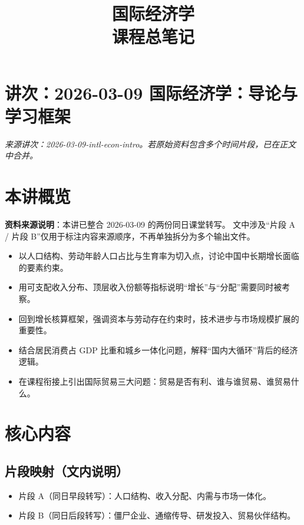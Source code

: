 \documentclass[UTF8,11pt,a4paper]{ctexart}
\title{ 国际经济学 \\ \large 课程总笔记 }
\author{}
\date{}
\begin{document}
\maketitle

\tableofcontents

\newpage

\section{讲次：2026-03-09 国际经济学：导论与学习框架}
\textit{来源讲次：2026-03-09-intl-econ-intro。若原始资料包含多个时间片段，已在正文中合并。}

\section{本讲概览}

\textbf{资料来源说明}：本讲已整合 2026-03-09 的两份同日课堂转写。
文中涉及“片段 A / 片段 B”仅用于标注内容来源顺序，不再单独拆分为多个输出文件。

\begin{itemize}
  \item 以人口结构、劳动年龄人口占比与生育率为切入点，讨论中国中长期增长面临的要素约束。
  \item 用可支配收入分布、顶层收入份额等指标说明“增长”与“分配”需要同时被考察。
  \item 回到增长核算框架，强调资本与劳动存在约束时，技术进步与市场规模扩展的重要性。
  \item 结合居民消费占 GDP 比重和城乡一体化问题，解释“国内大循环”背后的经济逻辑。
  \item 在课程衔接上引出国际贸易三大问题：贸易是否有利、谁与谁贸易、谁贸易什么。
\end{itemize}

\section{核心内容}

\subsection*{片段映射（文内说明）}

\begin{itemize}
  \item 片段 A（同日早段转写）：人口结构、收入分配、内需与市场一体化。
  \item 片段 B（同日后段转写）：僵尸企业、通缩传导、研发投入、贸易伙伴结构。
\end{itemize}
\end{document}
